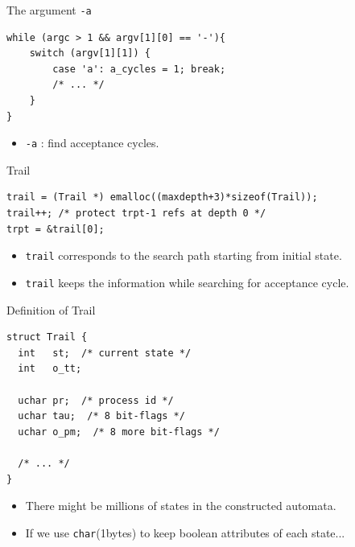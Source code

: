 \documentclass[12pt]{beamer}
\newcommand{\code}[1]{\texttt{#1}}
\begin{document}
\begin{frame}[fragile]{The argument \code{-a}}
\begin{lstlisting}[basicstyle=\normalsize\ttfamily]
while (argc > 1 && argv[1][0] == '-'){ 
    switch (argv[1][1]) {
        case 'a': a_cycles = 1; break;
        /* ... */
    }
}\end{lstlisting}
 	\begin{itemize}
 		\item \code{-a} : find acceptance cycles.
 	\end{itemize}
\end{frame}  


\begin{frame}[fragile]{Trail}
\begin{lstlisting}[basicstyle=\normalsize\ttfamily]
trail = (Trail *) emalloc((maxdepth+3)*sizeof(Trail));
trail++; /* protect trpt-1 refs at depth 0 */
trpt = &trail[0];
\end{lstlisting}
 	\begin{itemize}
		\item \code{trail} corresponds to the search path starting from initial state.
 		\item \code{trail} keeps the information while searching for acceptance cycle.
 	\end{itemize}
\end{frame}

\begin{frame}[fragile]{Definition of Trail}
\begin{lstlisting}[basicstyle=\normalsize\ttfamily]
struct Trail {
  int   st;  /* current state */
  int   o_tt;
  
  uchar pr;  /* process id */
  uchar tau;  /* 8 bit-flags */
  uchar o_pm;  /* 8 more bit-flags */
  
  /* ... */
}
\end{lstlisting}
\begin{itemize}
	\item There might be millions of states in the constructed automata.
	\item If we use \code{char}(1bytes) to keep boolean attributes of each state...
\end{itemize}
\end{frame}
\end{document}
